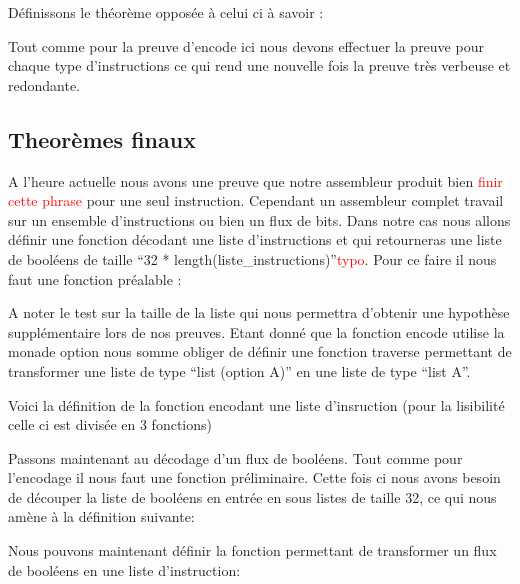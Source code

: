 \documentclass {article}
\newcommand{\codefrom}[3]
           {}
\theoremstyle{definition}
\theoremstyle{remark}
\newcommand{\todo}[1]{\textcolor{red}{#1}}
\begin{document}
Définissons le théorème opposée à celui ci à savoir :

\codefrom{src}{encodeProof}{decode_encode}

Tout comme pour la preuve d'encode ici nous devons effectuer la preuve pour chaque type d'instructions
ce qui rend une nouvelle fois la preuve très verbeuse et redondante. 




\subsection{Theorèmes finaux}

A l'heure actuelle nous avons une preuve que notre assembleur produit bien \todo{finir cette phrase}
pour une seul instruction. Cependant un assembleur complet travail sur un ensemble d'instructions
ou bien un flux de bits. Dans notre cas nous allons définir une fonction décodant une liste d'instructions et qui
retourneras une liste de booléens de taille ``32 * length(liste\_instructions)''\todo{typo}.
Pour ce faire il nous faut une fonction préalable :

\codefrom{src}{encode}{concat_listes_32}

A noter le test sur la taille de la liste
qui nous permettra d'obtenir une hypothèse supplémentaire lors de nos preuves.
Etant donné que la fonction encode utilise la monade option nous somme obliger de définir une fonction
traverse permettant de transformer une liste de type ``list (option A)'' en une liste de type ``list A''.

\codefrom{src}{encode}{traverse}

Voici la définition de la fonction encodant une liste d'insruction (pour la lisibilité celle ci est
divisée en 3 fonctions)

\codefrom{src}{encode}{encode_flux}

Passons maintenant au décodage d'un flux de booléens. Tout comme pour l'encodage il nous faut
une fonction préliminaire. Cette fois ci nous avons besoin de découper la liste de booléens
en entrée en sous listes de taille 32, ce qui nous amène à la définition suivante:

\codefrom{src}{encode}{cut_32}

Nous pouvons maintenant définir la fonction permettant de transformer un flux de booléens
en une liste d'instruction:

\codefrom{src}{encode}{decode_flux}
\end{document}

